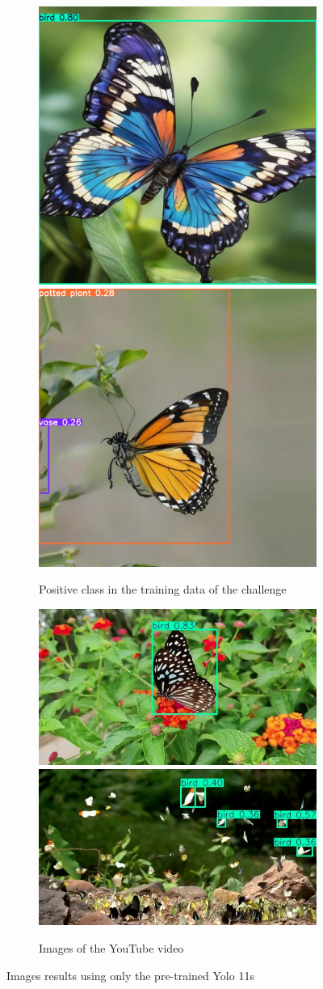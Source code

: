 \documentclass{cpsc202}
\begin{document}
\begin{figure}
        \begin{subfigure}{.9\textwidth}
            \centering
            \includegraphics[width=.4\linewidth]{pretrained/positive_imagen_45}
            \includegraphics[width=.4\linewidth]{pretrained/positive_imagen_888}
            \caption{Positive class in the training data of the challenge}
            \label{fig:positive-pretrainied}
        \end{subfigure}

        \begin{subfigure}{.9\textwidth}
            \centering
            \includegraphics[width=.4\linewidth]{pretrained/photogram_16}
            \includegraphics[width=.4\linewidth]{pretrained/photogram_93}
            \caption{Images of the YouTube video}
            \label{fig:video-pretrainied}
        \end{subfigure}
        \caption{Images results using only the pre-trained Yolo 11s}
        \label{fig:pre-trained}
    \end{figure}
\end{document}
